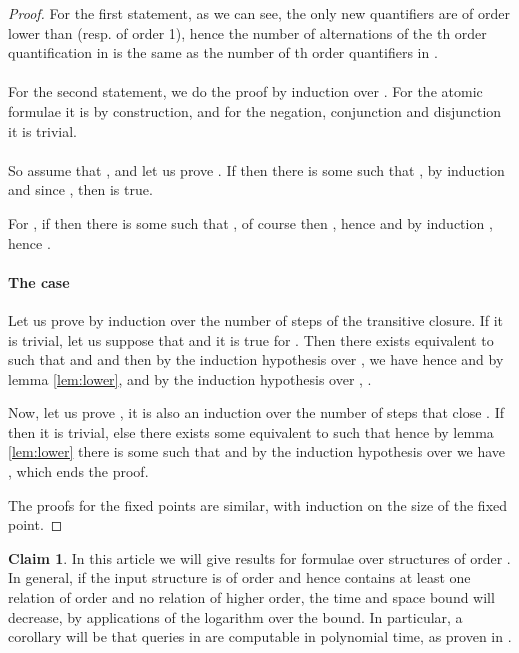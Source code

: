 \documentclass[a4paper,12pt]{article}
\theoremstyle{definition}
\newtheorem{claim}[theorem]{Claim}
\begin{document}
\begin{proof}
  For the first statement, as we can see, the only new quantifiers are
  of order lower than  (resp. of order 1), hence the number of
  alternations of the th order quantification in  is the same
  as the number of th order quantifiers in .
\paragraph{}
For the second statement, we do the proof by induction over
. For the atomic formulae it is by construction, and for the
negation, conjunction and disjunction it is trivial.

\paragraph{}So assume that , and let us prove . If  then there is some  such that , by induction  and
since , then  is true.

For , if  then there is some 
such that , of course then
, hence  and by induction , hence
.
 
\paragraph{The case } 

Let us prove  by induction over the number  of steps
of the transitive closure. If  it is trivial, let us suppose that
 and it is true for . Then there exists  equivalent
to  such that  and  and then by the induction hypothesis
over , we have  hence  and by lemma
\ref{lem:lower},  and by the induction
hypothesis over , .

Now, let us prove , it is also an induction over the number
of steps  that close . If  then it is trivial,
else there exists some  equivalent to  such that
 hence by lemma
\ref{lem:lower} there is some  such that  and by the induction hypothesis over  we have  , which ends the
proof.

The proofs for the fixed points are similar, with induction on the size
of the fixed point.
\end{proof}
\begin{claim}\label{highstructure}
  In this article we will give results for formulae over structures of
  order . In general, if the input structure is of order  and
  hence contains at least one relation of order  and no relation of
  higher order, the time and space bound will decrease, by 
  applications of the logarithm over the bound. In particular, a
  corollary will be that queries in  are computable in
  polynomial time, as proven in \cite{complex}.
\end{claim}
\end{document}
